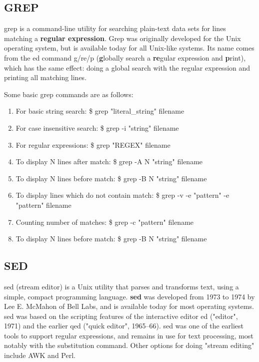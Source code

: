 \documentclass{beamer}
\begin{document}
    \begin{frame}
    \subsection{GREP}
    grep is a command-line utility for searching plain-text data sets for lines matching a \textbf{regular expression}. Grep was originally developed for the Unix operating system, but is available today for all Unix-like systems. Its name comes from the ed command g/re/p (\textbf{g}lobally search a \textbf{re}gular expression and \textbf{p}rint), which has the same effect: doing a global search with the regular expression and printing all matching lines.
\end{frame}
    \begin{frame}
    Some basic grep commands are as follows:
\begin{enumerate}
    \item
        For basic string search:
            \$ grep "literal\_string" filename
    \item
        For case insensitive search:
            \$ grep -i "string" filename
    \item
        For regular expressions:
            \$ grep  "REGEX" filename
    \item
        To display N lines after match:
            \$ grep  -A N "string" filename
    \item
        To display N lines before match:
            \$ grep  -B N "string" filename
    \item
        To display lines which do not contain match:
            \$ grep  -v -e "pattern" -e "pattern" filename
    \item
        Counting number of matches:
            \$ grep  -c "pattern" filename
    \item
        To display N lines before match:
            \$ grep  -B N "string" filename
\end{enumerate}
\end{frame}
    \begin{frame}
    \subsection{SED}
    sed (stream editor) is a Unix utility that parses and transforms text, using a simple, compact programming language. \textbf{sed} was developed from 1973 to 1974 by Lee E. McMahon of Bell Labs, and is available today for most operating systems. sed was based on the scripting features of the interactive editor ed ("editor", 1971) and the earlier qed ("quick editor", 1965–66). sed was one of the earliest tools to support regular expressions, and remains in use for text processing, most notably with the substitution command. Other options for doing "stream editing" include AWK and Perl.

    \end{frame}
\end{document}
